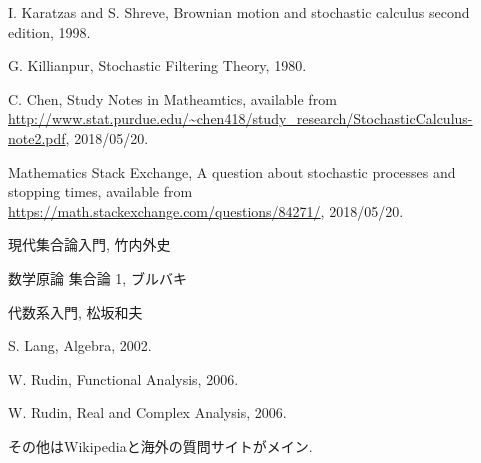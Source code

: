 \begin{thebibliography}{数字}
	 I. Karatzas and S. Shreve, Brownian motion and stochastic calculus second edition, 1998.
	
	 G. Killianpur, Stochastic Filtering Theory, 1980. 
	
	 C. Chen, Study Notes in Matheamtics, available from \url{http://www.stat.purdue.edu/~chen418/study_research/StochasticCalculus-note2.pdf}, 2018/05/20.

	 Mathematics Stack Exchange, A question about stochastic processes and stopping times, available from \url{https://math.stackexchange.com/questions/84271/}, 2018/05/20.
	
	 現代集合論入門, 竹内外史
	
	 数学原論 集合論 1, ブルバキ
	
	 代数系入門, 松坂和夫
	
	 S. Lang, Algebra, 2002.
	
	 W. Rudin, Functional Analysis, 2006.
	
	 W. Rudin, Real and Complex Analysis, 2006.
	
	 その他はWikipediaと海外の質問サイトがメイン.
\end{thebibliography}